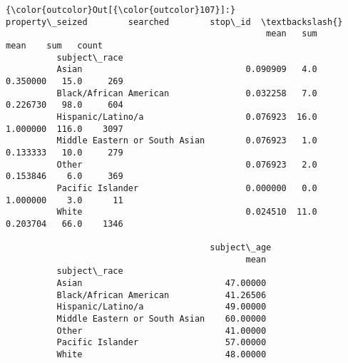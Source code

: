 \documentclass[11pt]{article}
\begin{document}
\begin{Verbatim}[commandchars=\\\{\}]
{\color{outcolor}Out[{\color{outcolor}107}]:}                               property\_seized        searched        stop\_id  \textbackslash{}
                                                   mean   sum      mean    sum   count   
          subject\_race                                                                   
          Asian                                0.090909   4.0  0.350000   15.0     269   
          Black/African American               0.032258   7.0  0.226730   98.0     604   
          Hispanic/Latino/a                    0.076923  16.0  1.000000  116.0    3097   
          Middle Eastern or South Asian        0.076923   1.0  0.133333   10.0     279   
          Other                                0.076923   2.0  0.153846    6.0     369   
          Pacific Islander                     0.000000   0.0  1.000000    3.0      11   
          White                                0.024510  11.0  0.203704   66.0    1346   
          
                                        subject\_age  
                                               mean  
          subject\_race                               
          Asian                            47.00000  
          Black/African American           41.26506  
          Hispanic/Latino/a                49.00000  
          Middle Eastern or South Asian    60.00000  
          Other                            41.00000  
          Pacific Islander                 57.00000  
          White                            48.00000  
\end{Verbatim}
            
\end{document}
